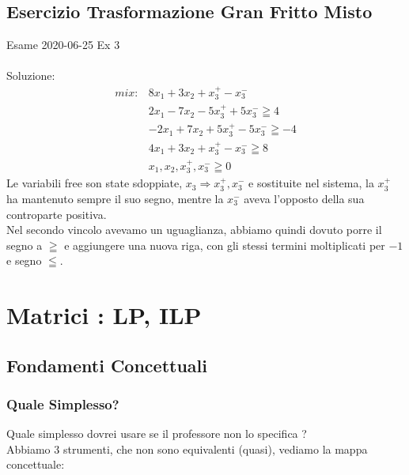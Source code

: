 \documentclass{article}
\begin{document}
\subsection{Esercizio Trasformazione Gran Fritto Misto}
Esame 2020-06-25 Ex 3\\
\noindent{}%
\\
Soluzione:\\
\begin{align*}
mix:  &8x_1 + 3x_2 + x_3^+ - x_3^- \\
    	&2x_1 - 7x_2 - 5x_3^+ + 5x_3^- \geqq 4\\
    	&-2x_1 + 7x_2 + 5x_3^+ - 5x_3^- \geqq -4\\
    	&4x_1 + 3x_2 + x_3^+ -x_3^- \geqq 8\\
    	&x_1,x_2,x_3^+,x_3^- \geqq 0
\end{align*}
Le variabili free son state sdoppiate, $x_3 \Rightarrow x_3^+,x_3^-$ e sostituite nel sistema, la $x_3^+$ ha mantenuto sempre il suo segno, mentre la $x_3^-$ aveva l'opposto della sua controparte positiva.\\
Nel secondo vincolo avevamo un uguaglianza, abbiamo quindi dovuto porre il segno a $\geqq$ e aggiungere una nuova riga, con gli stessi termini moltiplicati per $-1$ e segno $\leqq$.

\newpage
\section{Matrici : LP, ILP}

\subsection{Fondamenti Concettuali}
\subsubsection{Quale Simplesso?}
Quale simplesso dovrei usare se il professore non lo specifica ?\\
Abbiamo 3 strumenti, che non sono equivalenti (quasi), vediamo la mappa concettuale:\\
\end{document}
